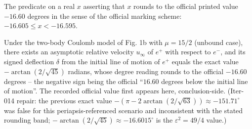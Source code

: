 \begin{definition}
\label{def:IPhO2026Problems_problem_IPhO_2026_1_B_2:roundsToOfficialDegrees}
The predicate on a real $x$ asserting that $x$ rounds to the official
printed value $-16.60$ degrees in the sense of the official marking scheme:
$-16.605 \le x < -16.595$.
\end{definition}

\begin{theorem}
\label{thm:IPhO2026Problems_problem_IPhO_2026_1_B_2:signed_deflection_angle_T1_B2}
Under the two-body Coulomb model of Fig. 1b with $\mu = 15/2$ (unbound
case), there exists an asymptotic relative velocity $u_\infty$ of $e^+$
with respect to $e^-$, and its signed deflection $\delta$ from the initial
line of motion of $e^+$ equals the exact value
$-\arctan(2/\sqrt{45})$ radians, whose degree reading rounds to
the official $-16.60$ degrees -- the negative sign being the official
``$16.60$ degrees below the initial line of motion''.  The recorded
official value first appears here, conclusion-side.
(Iter-014 repair: the previous exact value
$-(\pi - 2\arctan(2/\sqrt{63})) \approx -151.71^\circ$ was false for this
periapsis-referenced scenario and inconsistent with the stated rounding
band; $-\arctan(2/\sqrt{45}) \approx -16.6015^\circ$ is the
$\varepsilon^2 = 49/4$ value.)
\end{theorem}
